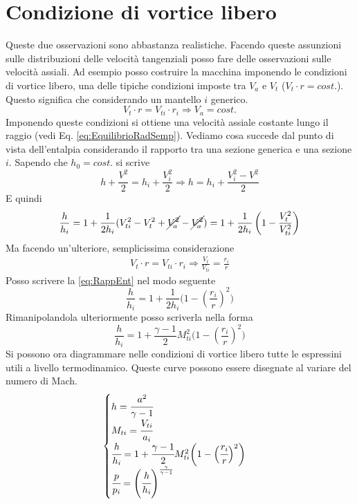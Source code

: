 \section{Condizione di vortice libero}
Queste due osservazioni sono abbastanza realistiche. 
Facendo queste assunzioni sulle distribuzioni delle velocità tangenziali posso fare delle osservazioni sulle velocità assiali. 
Ad esempio posso costruire la macchina imponendo le condizioni di vortice libero, una delle tipiche condizioni imposte tra $V_a$ e $V_t$ ($V_t \cdot r = cost.$).
Questo significa che considerando un mantello $i$ generico.
\begin{equation}
V_t \cdot r = V_{ti} \cdot r_i \Rightarrow V_a = cost.
\end{equation}
Imponendo queste condizioni si ottiene una velocità assiale costante lungo il raggio (vedi Eq. \ref{eq:EquilibrioRadSemp}). Vediamo cosa succede dal punto di vista dell'entalpia considerando il rapporto tra una sezione generica e una sezione $i$. Sapendo che $h_0 = cost.$ si scrive
\begin{equation}
h + \frac{V^2}{2} = h_i + \frac{V_i^2}{2} \Rightarrow h = h_i	+ \frac{V_i^2 - V^2}{2}
\end{equation}
E quindi
\begin{equation}
\frac{h}{h_i} = 1 + \frac{1}{2h_i} (V_{ti}^2-V_t^2 + \cancel{V_a^2} -\cancel{V_a^2}) = 1 + \frac{1}{2h_i} \left( 1- \frac{V_t^2}{V_{ti}^2} \right)
\label{eq:RappEnt}
\end{equation}
Ma facendo un'ulteriore, semplicissima considerazione
\begin{align*}
V_t \cdot r = V_{ti} \cdot r_i \Rightarrow \frac{V_t}{V_{ti}} = \frac{r_i}{r}
\end{align*}
Posso scrivere la \ref{eq:RappEnt} nel modo seguente
\begin{equation}
\boxed{ \frac{h}{h_i} = 1 + \frac{1}{2h_i} \bigg(1 -  \left( \frac{r_i}{r}\right)^2 \bigg)}
\end{equation}
Rimanipolandola ulteriormente posso scriverla nella forma
\begin{equation}
\frac{h}{h_i} = 1 + \frac{\gamma -1}{2} M_{ti}^2 \bigg(1 -  \left( \frac{r_i}{r}\right)^2 \bigg) 
\end{equation}
Si possono ora diagrammare nelle condizioni di vortice libero tutte le espressini utili a livello termodinamico. Queste curve possono essere disegnate al variare del numero di Mach.
\begin{equation}
\begin{cases}
h = \cfrac{a ^ 2}{\gamma - 1} \\
M_{ti} = \cfrac{V_{ti}}{a_i}\\
\cfrac{h}{h_i} = 1 + \cfrac{\gamma -1}{2} M_{ti}^2 \bigg(1 -  \Big( \cfrac{r_i}{r}\Big)^2 \bigg)\\
\cfrac{p}{p_i} = \left( \cfrac{h}{h_i} \right)^{\frac{\gamma}{\gamma - 1}}
\end{cases}
\end{equation}

